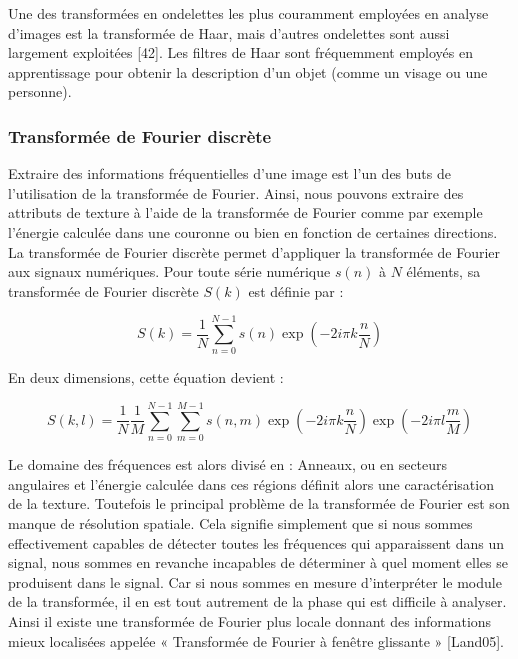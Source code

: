 Une des transformées en ondelettes les plus couramment employées en analyse d'images est la
transformée de Haar, mais d'autres ondelettes sont aussi largement exploitées [42]. Les filtres
de Haar sont fréquemment employés en apprentissage pour obtenir la description d'un objet
(comme un visage ou une personne).

\subsubsection{Transformée de Fourier discrète}
Extraire des informations fréquentielles d’une image est l’un des buts de l’utilisation de la
transformée de Fourier. Ainsi, nous pouvons extraire des attributs de texture à l’aide de la
transformée de Fourier comme par exemple l’énergie calculée dans une couronne ou bien en
fonction de certaines directions.\\

La transformée de Fourier discrète permet d’appliquer la transformée de Fourier aux signaux
numériques. Pour toute série numérique $s(n)$ à $N$ éléments, sa transformée de Fourier discrète
$S(k)$ est définie par :

\begin{equation}
	S(k) = \frac{1}{N} \sum_{n=0}^{N-1} s(n) \exp(-2i\pi k\frac{n}{N})
\end{equation}

En deux dimensions, cette équation devient :

\begin{equation}
S(k, l) = \frac{1}{N}\frac{1}{M} \sum_{n=0}^{N-1} \sum_{m=0}^{M-1} s(n, m) \exp(-2i\pi k\frac{n}{N}) \exp(-2i\pi l\frac{m}{M})
\end{equation}

Le domaine des fréquences est alors divisé en : Anneaux, ou en secteurs angulaires et l’énergie calculée dans ces régions définit alors une caractérisation de la texture. Toutefois le principal problème de la transformée de Fourier est son manque de résolution spatiale. Cela signifie simplement que si nous sommes effectivement capables de détecter toutes les fréquences qui apparaissent dans un signal, nous sommes en revanche incapables de déterminer à quel moment elles se produisent dans le signal. Car si nous sommes en mesure d’interpréter le module de la transformée, il en est tout autrement de la phase qui est difficile à analyser. Ainsi il existe une transformée de Fourier plus locale donnant des informations mieux localisées appelée « Transformée de Fourier à fenêtre glissante » [Land05].


